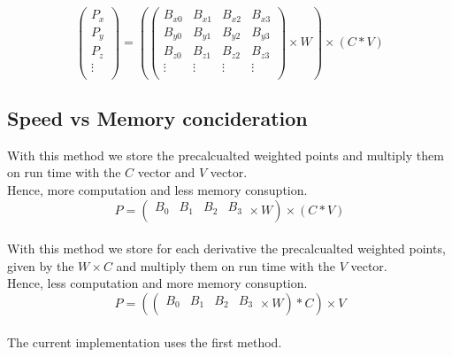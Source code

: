 \begin{equation*}
    \left(
    \begin{array}{cccc}
        P_x    \\
        P_y    \\
        P_z    \\
        \vdots \\
    \end{array}
    \right)
    =
    \left(
    \left(
    \begin{array}{cccc}
        B_{x0} & B_{x1} & B_{x2} & B_{x3} \\
        B_{y0} & B_{y1} & B_{y2} & B_{y3} \\
        B_{z0} & B_{z1} & B_{z2} & B_{z3} \\
        \vdots & \vdots & \vdots & \vdots \\
    \end{array}
    \right)
    \times
    W
    \right)
    \times
    \left(
    C
    *
    V
    \right)
\end{equation*}

\subsection{Speed vs Memory concideration}

With this method we store the precalcualted weighted points and multiply them on run time with the $C$ vector and $V$ vector.\\
Hence, more computation and less memory consuption.
\begin{equation*}
    P=
    \left(
    \begin{array}{cccc}
        B_0 & B_1 & B_2 & B_3 \\
    \end{array}
    \times
    W
    \right)
    \times
    \left(
    C
    *
    V
    \right)
\end{equation*}
\\
With this method we store for each derivative the precalcualted weighted points, given by the $W \times C$ and multiply them on run time with the $V$ vector.\\
Hence, less computation and more memory consuption.
\begin{equation*}
    P=
    \left(
    \left(
    \begin{array}{cccc}
        B_0 & B_1 & B_2 & B_3 \\
    \end{array}
    \times
    W\right)
    *
    C
    \right)
    \times
    V
\end{equation*}
\\
The current implementation uses the first method.